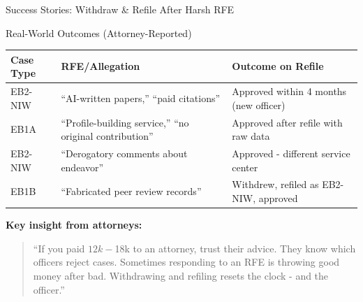 \documentclass[11pt]{beamer}
\begin{document}
	\begin{frame}{Success Stories: Withdraw \& Refile After Harsh RFE}
		\scriptsize
		\begin{block}{Real-World Outcomes (Attorney-Reported)}
			\centering
			\begin{tabular}{|p{3cm}|p{4.5cm}|p{3cm}|}
				\hline
				\textbf{Case Type} & \textbf{RFE/Allegation} & \textbf{Outcome on Refile} \\
				\hline
				EB2-NIW & ``AI-written papers,'' ``paid citations'' & Approved within 4 months (new officer) \\
				\hline
				EB1A & ``Profile-building service,'' ``no original contribution'' & Approved after refile with raw data \\
				\hline
				EB2-NIW & ``Derogatory comments about endeavor'' & Approved - different service center \\
				\hline
				EB1B & ``Fabricated peer review records'' & Withdrew, refiled as EB2-NIW, approved \\
				\hline
			\end{tabular}
			\vspace{0.2cm}
			\textbf{Key insight from attorneys:}
			\begin{quote}
				``If you paid $12k-$18k to an attorney, trust their advice. They know which officers reject cases. Sometimes responding to an RFE is throwing good money after bad. Withdrawing and refiling resets the clock - and the officer.''
			\end{quote}
		\end{block}
	\end{frame}
	
\end{document}
